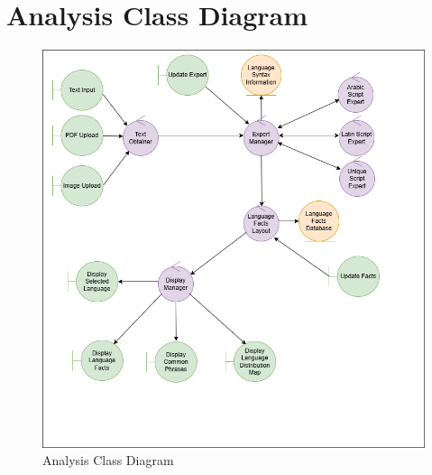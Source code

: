 \section{Analysis Class Diagram}
\label{sec:overall_description}



\begin{figure}[H]
	\centering
	\includegraphics[width=\linewidth]{Section2/class_diagramV3.png}
	\caption{Analysis Class Diagram}
	\label{AnalysisClassDiagram}
\end{figure}


